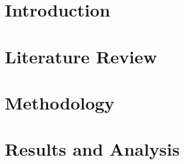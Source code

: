 \documentclass[11pt]{book}
\renewcommand{\baselinestretch}{1.2}
\begin{document}


\newpage
\thispagestyle{empty}
\renewcommand{\thesisdedication}{{\large Copyright \copyright~Ritvik Aryan Kalra, 2024\\}{\large All Rights Reserved\\}}
\thesisdedicationpage


\mastersthesis
%
% 
%
\tableofcontents
\listoffigures
\let\cleardoublepage\clearpage
\listoftables
\printglossary[type=\acronymtype,title=Abbreviations,nonumberlist]
\printunsrtglossary[type=symbols]

% 

\chapter{Introduction}
\label{ch:intro}


\chapter{Literature Review}
\label{ch:literature review}



\chapter{Methodology}
\label{ch:methodology}



\chapter{Results and Analysis}
\label{ch:results_and_analysis}

\end{document}
